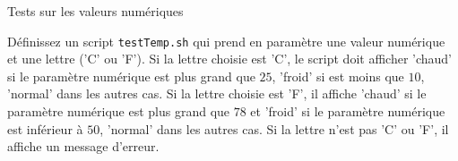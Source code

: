 \begin{exercice}
  \begin{exercicelet}{Tests sur les valeurs numériques}
    \begin{questions}
    \item Définissez un script \texttt{testTemp.sh} qui prend en paramètre une valeur numérique et une lettre ('C' ou 'F'). Si la lettre choisie est 'C', le script doit afficher 'chaud' si le paramètre numérique est plus grand que $25$, 'froid' si est moins que $10$, 'normal' dans les autres cas. Si la lettre choisie est 'F', il affiche 'chaud' si le paramètre numérique est plus grand que $78$ et 'froid' si le paramètre numérique est inférieur à $50$, 'normal' dans les autres cas. Si la lettre n'est pas 'C' ou 'F', il affiche un message d'erreur. 
    \end{questions}
  \end{exercicelet}
\end{exercice}

